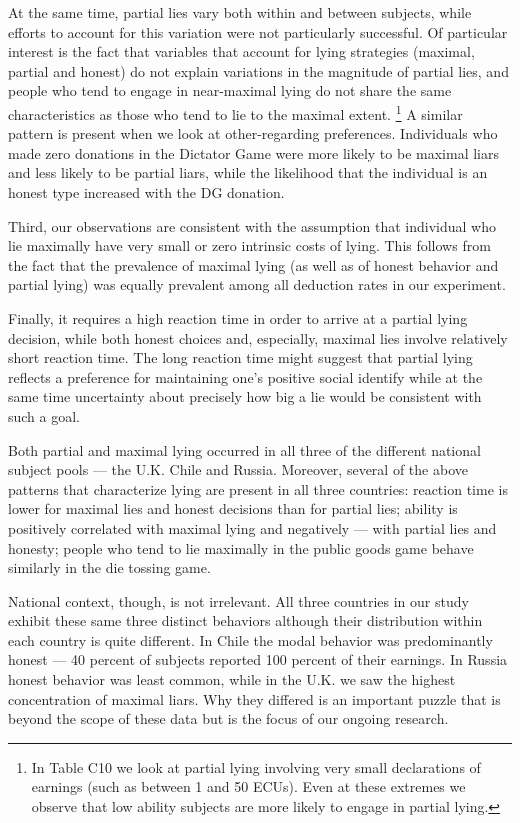 \documentclass[12pt]{article}
\begin{document}
\par At the same time, partial lies vary both within and between subjects, while efforts to account for this variation were not particularly successful.  Of particular interest is the fact that variables that account for lying strategies (maximal, partial and honest) do not explain variations in the magnitude of partial lies, and people who tend to engage in near-maximal lying do not share the same characteristics as those who tend to lie to the maximal extent. \footnote{In Table C10 we look at partial lying involving very small declarations of earnings (such as between 1 and 50 ECUs).  Even at these extremes we observe that low ability subjects are more likely to engage in partial lying.} A similar pattern is present when we look at other-regarding preferences. Individuals who made zero donations in the Dictator Game were more likely to be maximal liars and less likely to be partial liars, while the likelihood that the individual is an honest type increased with the DG donation. 

\par Third, our observations are consistent with the assumption that individual who lie maximally have very small or zero intrinsic costs of lying. This follows from the fact that the prevalence of maximal lying (as well as of honest behavior and partial lying) was equally prevalent among all deduction rates in our experiment. 
 
\par Finally, it requires a high reaction time in order to arrive at a partial lying decision, while both honest choices and, especially, maximal lies involve relatively short reaction time. The long reaction time might suggest that partial lying reflects a preference for maintaining one’s positive social identify while at the same time uncertainty about precisely how big a lie would be consistent with such a goal.

\par Both partial and maximal lying occurred in all three of the different national subject pools --- the U.K. Chile and Russia. Moreover, several of the above patterns that characterize lying are present in all three countries: reaction time is lower for maximal lies and honest decisions than for partial lies; ability is positively correlated with maximal lying and negatively --- with partial lies and honesty; people who tend to lie maximally in the public goods game behave similarly in the die tossing game. 

\par National context, though, is not irrelevant.  All three countries in our study exhibit these same three distinct behaviors although their distribution within each country is quite different.  In Chile the modal behavior was predominantly honest --- 40 percent of subjects reported 100 percent of their earnings. In Russia honest behavior was least common, while in the U.K. we saw the highest concentration of maximal liars.  Why they differed is an important puzzle that is beyond the scope of these data but is the focus of our ongoing research. 
\end{document}
